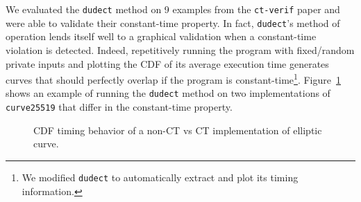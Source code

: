 We evaluated the \texttt{dudect} method on 9 examples from the \texttt{ct-verif} paper and were able to validate their constant-time property.
In fact, \texttt{dudect}'s method of operation lends itself well to a graphical validation when a constant-time violation is detected.
Indeed, repetitively running the program with fixed/random private inputs and plotting the CDF of its average execution time generates curves that should perfectly overlap if the program is constant-time\footnote{We modified \texttt{dudect} to automatically extract and plot its timing information.}.
Figure~\ref{fig:dudect_donna} shows an example of running the \texttt{dudect} method on two implementations of \texttt{curve25519} that differ in the constant-time property.

\begin{figure}[h]
  \centering
  \label{fig:dudect_donnabad}
  \label{fig:dudect_donnagood}
  \caption{CDF timing behavior of a non-CT vs CT implementation of elliptic curve.}
  \label{fig:dudect_donna}
\end{figure}


